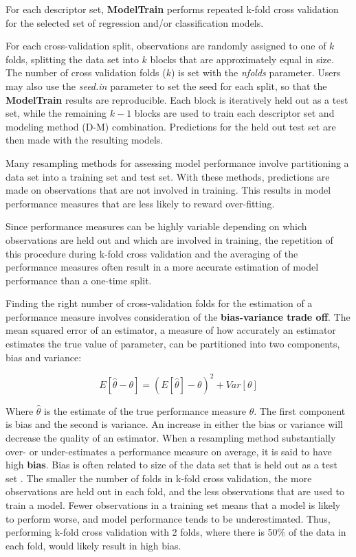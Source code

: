 For each descriptor set, \textbf{ModelTrain} performs repeated k-fold
cross validation for the selected set of regression and/or
classification models.

For each cross-validation split, observations are randomly assigned to
one of \(k\) folds, splitting the data set into \(k\) blocks that are
approximately equal in size. The number of cross validation folds
(\(k\)) is set with the \textit{nfolds} parameter. Users may also use
the \textit{seed.in} parameter to set the seed for each split, so that
the \textbf{ModelTrain} results are reproducible. Each block is
iteratively held out as a test set, while the remaining \(k-1\) blocks
are used to train each descriptor set and modeling method (D-M)
combination. Predictions for the held out test set are then made with
the resulting models.

Many resampling methods for assessing model performance involve
partitioning a data set into a training set and test set. With these
methods, predictions are made on observations that are not involved in
training. This results in model performance measures that are less
likely to reward over-fitting.

Since performance measures can be highly variable \citep{James2013}
depending on which observations are held out and which are involved in
training, the repetition of this procedure during k-fold cross
validation and the averaging of the performance measures often result in
a more accurate estimation of model performance than a one-time split.

Finding the right number of cross-validation folds for the estimation of
a performance measure involves consideration of the
\textbf{bias-variance trade off}. The mean squared error of an
estimator, a measure of how accurately an estimator estimates the true
value of parameter, can be partitioned into two components, bias and
variance:

\[E[\hat{\theta} - \theta] = (E[\hat{\theta}] - \theta)^2 + Var[\theta]\]

Where \(\hat{\theta}\) is the estimate of the true performance measure
\(\theta\). The first component is bias and the second is variance. An
increase in either the bias or variance will decrease the quality of an
estimator. When a resampling method substantially over- or
under-estimates a performance measure on average, it is said to have
high \textbf{bias}. Bias is often related to size of the data set that
is held out as a test set \citep{James2013}. The smaller the number of
folds in k-fold cross validation, the more observations are held out in
each fold, and the less observations that are used to train a model.
Fewer observations in a training set means that a model is likely to
perform worse, and model performance tends to be underestimated. Thus,
performing k-fold cross validation with 2 folds, where there is 50\% of
the data in each fold, would likely result in high bias.

